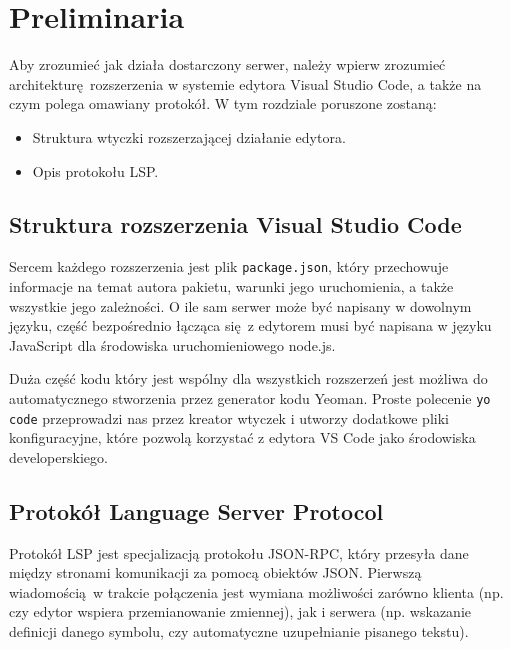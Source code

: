 \chapter{Preliminaria}
Aby zrozumieć jak działa dostarczony serwer, należy wpierw zrozumieć architekturę rozszerzenia w systemie edytora Visual Studio Code, a także na czym polega omawiany protokół. W tym rozdziale poruszone zostaną:

\begin{itemize}
    \item Struktura wtyczki rozszerzającej działanie edytora.
    \item Opis protokołu LSP.
\end{itemize}

\section{Struktura rozszerzenia Visual Studio Code}
Sercem każdego rozszerzenia jest plik \texttt{package.json}, który przechowuje informacje na temat autora pakietu, warunki jego uruchomienia, a także wszystkie jego zależności. O ile sam serwer może być napisany w dowolnym języku, część bezpośrednio łącząca się z edytorem musi być napisana w języku JavaScript dla środowiska uruchomieniowego node.js. 

Duża część kodu który jest wspólny dla wszystkich rozszerzeń jest możliwa do automatycznego stworzenia przez generator kodu Yeoman. Proste polecenie \texttt{yo code} przeprowadzi nas przez kreator wtyczek i utworzy dodatkowe pliki konfiguracyjne, które pozwolą korzystać z edytora VS Code jako środowiska developerskiego.

\section{Protokół Language Server Protocol}
Protokół LSP jest specjalizacją protokołu JSON-RPC, który przesyła dane między stronami komunikacji za pomocą obiektów JSON. Pierwszą wiadomością w trakcie połączenia jest wymiana możliwości zarówno klienta (np. czy edytor wspiera przemianowanie zmiennej), jak i serwera (np. wskazanie definicji danego symbolu, czy automatyczne uzupełnianie pisanego tekstu).

